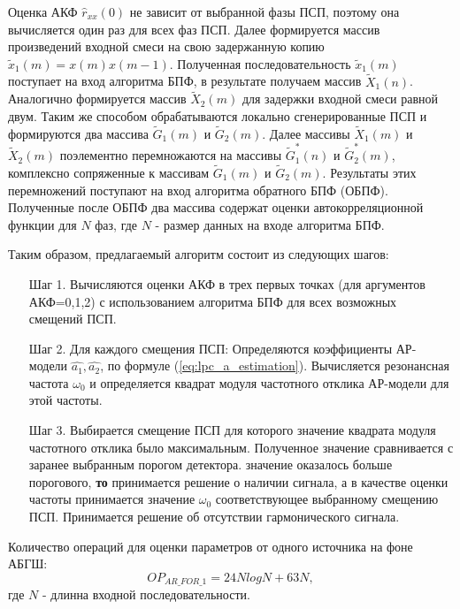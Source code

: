 Оценка АКФ ${\hat{r}_{xx}(0)}$ не зависит от выбранной фазы ПСП, поэтому она вычисляется один
раз для всех фаз ПСП. Далее формируется массив произведений входной смеси на
свою задержанную копию ${\tilde{x}_1(m)=x(m)x(m-1)}$. Полученная последовательность  
${\tilde{x}_1(m)}$ поступает на вход алгоритма БПФ, в результате получаем массив ${\tilde{X}_1(n)}$.
Аналогично формируется массив  ${\tilde{X}_2(m)}$ для
задержки входной смеси равной двум. Таким же способом обрабатываются локально
сгенерированные ПСП и формируются два массива ${\tilde{G}_1(m)}$ и ${\tilde{G}_2(m)}$.
Далее массивы ${\tilde{X}_1(m)}$ и ${\tilde{X}_2(m)}$ поэлементно перемножаются
на массивы ${\tilde{G}_1^*(n)}$ и ${\tilde{G}_2^*(m)}$, комплексно сопряженные к массивам ${\tilde{G}_1(m)}$ и ${\tilde{G}_2(m)}$.
Результаты этих перемножений поступают на вход алгоритма обратного
БПФ (ОБПФ). Полученные после ОБПФ два массива содержат оценки автокорреляционной функции для ${N}$ 
фаз, где  ${N}$ - размер данных на входе алгоритма БПФ.

Таким образом, предлагаемый алгоритм состоит из следующих шагов:

\begin{itemize}[align=left,style=nextline,leftmargin=*,labelsep=\parindent,font=\normalfont]
\item[Шаг 1.] Вычисляются оценки  АКФ в трех первых точках (для аргументов АКФ=0,1,2)
	с использованием алгоритма БПФ для всех возможных смещений ПСП. 
\item[Шаг 2.] Для каждого смещения ПСП: 
	Определяются коэффициенты АР-модели ${\hat{a_1}, \hat{a_2}}$, 
	по формуле (\ref{eq:lpc_a_estimation}). 
	Вычисляется резонансная частота ${\omega_0}$
	и определяется квадрат модуля частотного отклика АР-модели для этой частоты. 
\item[Шаг 3.] Выбирается смещение ПСП для которого значение квадрата модуля частотного отклика было максимальным. Полученное значение сравнивается с заранее выбранным порогом детектора. 
	  значение оказалось больше порогового, {\bf{то}} 
		принимается решение о наличии сигнала, а в качестве оценки
		частоты принимается значение ${\omega_0}$ соответствующее выбранному смещению ПСП. 
		Принимается решение об отсутствии гармонического сигнала.
\end{itemize}

Количество операций для оценки параметров от одного источника на фоне АБГШ:
\begin{equation}
	\label{eq:complexity_ar_for_1}
	OP_{AR\_FOR\_1} = 24NlogN + 63N,
\end{equation}
где ${N}$ - длинна входной последовательности.

